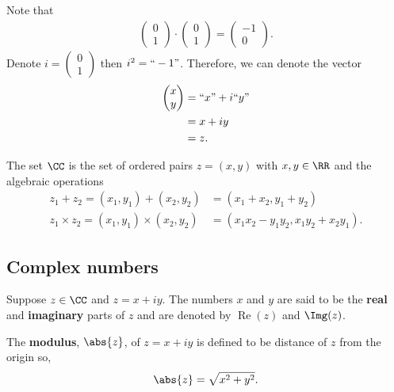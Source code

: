 \documentclass[12pt, a4paper]{article}
\DeclareMathOperator{\R}{Re}
\begin{document}
Note that 
\[\begin{aligned}
    \begin{pmatrix} 0 \\ 1 \end{pmatrix} \cdot \begin{pmatrix} 0 \\ 1 \end{pmatrix} = \begin{pmatrix} -1 \\ 0 \end{pmatrix}.
\end{aligned}\]
Denote \(i = \begin{pmatrix} 0 \\ 1 \end{pmatrix}\) then \(i^2 = ``-1"\). Therefore, we can denote the vector 
\[\begin{aligned}
    \begin{pmatrix} x \\ y \end{pmatrix} &= ``x" +i ``y" \\
    &= x+iy \\
    &=z.
\end{aligned}\]

\begin{definition}
    The set \(\CC\) is the set of ordered pairs \(z = (x,y)\) with \(x,y \in \RR\) and the algebraic operations 
    \[\begin{aligned}
        z_1 + z_2 = (x_1,y_1) + (x_2,y_2) &= (x_1+x_2,y_1+y_2) \\
        z_1 \times z_2 = (x_1,y_1) \times (x_2,y_2) &= (x_1x_2 - y_1y_2, x_1y_2+x_2 y_1).
    \end{aligned}\]
\end{definition}

\subsection{Complex numbers}

\begin{definition}
    Suppose \(z \in \CC\) and \(z = x+iy\). The numbers \(x\) and \(y\) are said to be the \textbf{real} and \textbf{imaginary} parts of \(z\) and are denoted by \(\R(z)\) and \(\Img(z)\).
\end{definition}

\begin{definition}
    The \textbf{modulus}, \(\abs{z}\), of \(z=x+iy\) is defined to be distance of \(z\) from the origin so,
    \[\abs{z} = \sqrt{x^2+y^2}.\]
\end{definition}
\end{document}
